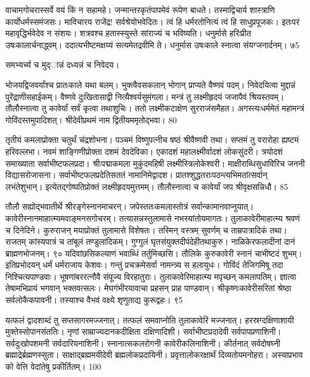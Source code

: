 वाचामगोचरास्सर्वे वयं किं न सहामहे।
जन्मान्तरकृतंपापमेवं रूपेण बाधते।
तस्माद्विचार्य शास्त्राणि कार्योधर्मस्समंजसः।
माविचारय राजेंद्र! सर्वश्रेयोभवेदितः।
त्वं हि धर्मरतोनित्यं त्वं हि साधुप्रपूजकः।
इतःपरं महावृद्धिर्भवेदेव न संशयः।
शत्रवश्च हतास्स्युस्ते सांराज्यं च भविष्यति।
धनुर्मासे हरिःप्रीत उषःकालार्चनाद्ध्वम्।
ददात्यभीष्टमक्षय्यं सत्यमेतद्रवीमि ते।
धनुर्मास उषःकाले स्नात्वा संयग्जनार्दनम्।
७5

समभ्यर्च्य च मुद्ान्नं दध्यन्नं च निवेदय।

भोजयद्विजवर्यांश्च प्रातःकाले यथा बलम्।
भुक्त्वैवसकलान् भोगान् प्राप्यते वैष्णवं पदम्।
निवेदयित्वा मुद्दान्नं पुरेंद्राणीसहाईकम्।
वैष्णवे दुःखितासाद्वी नित्यैश्वर्यसुमंगला।
मन्त्रं तु लक्ष्मीहृदयं जजापैवं श्रियस्तवम्।
तौलौस्नात्वा तु कावेर्यां सर्वं कृत्वा तथाशुचिः।
ततो लक्ष्मीकटाक्षेण सुरराजंसमैहत।
अगस्त्यःधर्ममेतं महामन्त्रं गोविंदस्तमुपादिशत्।
श्रीदेवीप्रथमं नाम द्वितीयममृतोद्भवा।
80

तृतीयं कमलाप्रोक्ता चतुर्थं चंद्रशोभना।
पञ्चमं विष्णुपत्नीच षष्ठं श्रीवैष्णवी तथा।
सप्तमं तु वरारोहा ह्यष्टमं हरिवल्लभा।
नवमं शाङ्गिणीप्रोक्ता दशमं देवदेविका।
एकादशं महालक्ष्मीर्वादशं लोकसुंदरी।
त्रयोदशं समाख्याता सर्वाभीष्टफलप्रदा।
श्रीःपद्माकमला मुकुंदमहिषी लक्ष्मीस्त्रिलोकेश्वरी।
माक्षीराब्धिसुधाविरिच जननी विद्यासरोजासना।
सर्वाभीष्टफलप्रदेतिसततं नामानिमेद्वादश।
प्रातश्शुद्धतराःपठन्त्यभिमतांत्सर्वान् लभंतेशुभान्।
इत्येतद्गोष्पतिप्रोक्तं लक्ष्मीहृदयमुत्तमम्।
तौलौस्नात्वा च कावेर्यां जप श्रीवृक्षसन्निधौ।
85


तौलौ सह्योद्भवातीर्थे श्रीरङ्गेस्नानमाचरन्।
जपेस्ततःकमलास्तोत्रं सर्वान्कामानवाप्नुयात्।
कावेरीस्नानमाहात्म्यमवाङ्मनसगोचरम्।
तत्यासन्नस्तुलामासे नभस्यांतोयमागतः।
तुलाकावेरीमाहात्म्य श्रवणं च दिनेदिने।
कुरुराजन् मयाप्रोक्तं तुलामासे विशेषतः।
तस्मिन् वस्त्रम् सुवर्णम् च ताम्रपात्रादिकं तथा।
राजतम् कांस्यपात्रं च तांबूलं तण्डुलादिकम्।
गुग्गुलं घृतसंयुक्तदीपंदेहीतथाकुरु।
नाळिकेरफलादीनां दानं ब्राह्मणभोजनम्।
९० यदिवांछसिकल्याणं भवाब्धिं तर्तुमिच्छसि।
तौलिके कुरुकावेरी स्नानं चाभीष्टदं शुभम्।
इतिप्रभोदयन् धर्मं धर्मराजाय केशवः।
गन्तुं प्रचक्रमेसर्वा नामन्त्र्य स हलायुधः।
गोविंदं तेजिगमिषू तदा निश्चित्यपाण्डवाः।
भूषणांबररत्नौवै संपूज्य विरहातुराः।
तुलाकावेरिमाहात्म्य मपृच्छन् कमलापतिम्।
ज्ञात्वा तेषामभिप्रायं भगवान् भक्तवत्सलः।
मेघगंभीरयावाचा प्रहसन् प्राह पाण्डवान्।
श्रीकृष्णःकावेरीसरितां श्रेष्ठा सर्वलोकैकपावनी।
तस्याश्च वैभवं वक्ष्ये शृणुताद्य कुरूद्वहः।
९5


यत्फलं द्वादशाब्दं तु सप्तसागरमज्जनात्।
तत्फलं समवाप्नोति तुलाकावेरि मज्जनात्।
हरस्रग्दक्षिणाशायी मुक्तेस्सोपानसंततिः।
नृणां साम्राज्यदानकदीक्षिता दक्षिणादिशी।
सर्वाभीष्टप्रदादेवी सर्वपापप्रणाशिनी।
सर्वदुःखोपशमनी सर्वदारियनाशिनी।
स्नानात्सकलरोगनी कावेरीकलिनाशिनी।
कीर्तनात् सर्वदोषघ्नी ब्रह्माद्रेर्ब्रह्मणस्सुता।
साक्षाद्ब्रह्ममयीदेवी ब्रह्मलोकप्रदायिनी।
प्रवृत्तालोकरक्षार्थं दिव्यतोयमनोहरा।
अस्याप्रभाव को वेत्ति वेदांतेषु प्रकीर्तितम्।
100

